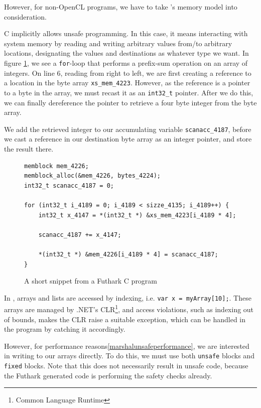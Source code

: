 However, for non-OpenCL \csharp{} programs, we have to take \csharp{}'s memory
model into consideration.

C implicitly allows unsafe programming. In this case, it means interacting with system
memory by reading and writing arbitrary values from/to arbitrary locations,
designating the values and destinations as whatever type we want.
In figure \ref{fig:futharkcscene}, we see a \texttt{for}-loop that
performs a prefix-sum operation on an array of integers.
On line 6, reading from right to left, we are first creating a reference to
a location in the byte array \texttt{xs\_mem\_4223}. However, as the reference
is a pointer to a byte in the array, we must recast it as an \texttt{int32\_t} pointer.
After we do this, we can finally dereference the pointer to retrieve a four byte
integer from the byte array.

We add the retrieved integer to our accumulating variable
\texttt{scanacc\_4187}, before we cast a reference in our destination byte array
as an integer pointer, and store the result there.

\begin{figure}
\centering
\begin{verbatim}
memblock mem_4226;
memblock_alloc(&mem_4226, bytes_4224);
int32_t scanacc_4187 = 0;

for (int32_t i_4189 = 0; i_4189 < sizze_4135; i_4189++) {
    int32_t x_4147 = *(int32_t *) &xs_mem_4223[i_4189 * 4];
    
    scanacc_4187 += x_4147;

    *(int32_t *) &mem_4226[i_4189 * 4] = scanacc_4187;
}
\end{verbatim}
\caption{A short snippet from a Futhark C program}
\label{fig:futharkcscene}
\end{figure} 

In \csharp{}, arrays and lists are accessed by indexing, i.e. \texttt{var
  x = myArray[10];}.
These arrays are managed by .NET's CLR\footnote{Common Language Runtime}, and
access violations, such as indexing out of bounds, makes the CLR raise a suitable
exception, which can be handled in the \csharp{} program by catching it
accordingly.

However, for performance reasons\ref{marshalunsafeperformance}, we are 
interested in writing to our \csharp{} arrays directly.
To do this, we must use both \texttt{unsafe} blocks and \texttt{fixed} blocks.
Note that this does not necessarily result in unsafe code, because the Futhark
generated code is performing the safety checks already.

